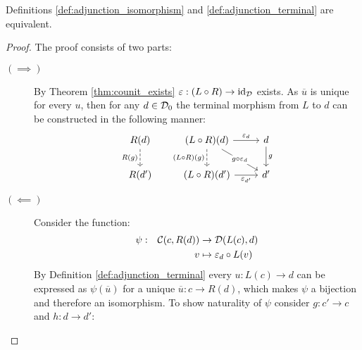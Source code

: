 \begin{theorem}
  Definitions \ref{def:adjunction_isomorphism} and \ref{def:adjunction_terminal}
  are equivalent.

  \begin{proof}
    The proof consists of two parts:
    \begin{description}
      \item[$(\implies)$] By Theorem \ref{thm:counit_exists} $\varepsilon:(L\circ
        R) \to \mathrm{id}_{\mathcal{D}}$ exists. As $\overline{u}$ is unique for every $u$, then for
        any $d\in\mathcal{D}_0$ the terminal morphism from $L$ to $d$ can be constructed
        in the following manner:
        \[\begin{tikzcd}[ampersand replacement=\&] {R(d)} \& {(L\circ R)(d)} \&
          d \\
          {R(d')} \& {(L\circ R)(d')} \& {d'}
          \arrow["{\epsilon_d}", from=1-2, to=1-3]
          \arrow["{\epsilon_{d'}}"', from=2-2, to=2-3]
          \arrow["g", from=1-3, to=2-3]
          \arrow["{R(g)}"', dashed, from=1-1, to=2-1]
          \arrow["{g\circ \epsilon_d}"{description}, from=1-2, to=2-3]
          \arrow["{(L\circ R)(g)}"', dashed, from=1-2, to=2-2]
        \end{tikzcd}\]
      \item[$(\impliedby)$] Consider the function:
        \[
          \begin{aligned}
            \psi:&&\mathcal{C}(c, R(d)) &\to \mathcal{D}(L(c), d)\\
            &&v&\mapsto \varepsilon_d\circ L(v)
          \end{aligned}
        \]
        By Definition \ref{def:adjunction_terminal} every $u:L(c)\to d$ can be
        expressed as $\psi(\overline{u})$ for a unique $\overline{u}:c\to R(d)$, which
        makes $\psi$ a bijection and therefore an isomorphism. To show
        naturality of $\psi$ consider $g:c'\to c$ and $h:d\to d'$:

\end{description}
\end{proof}
\end{theorem}
